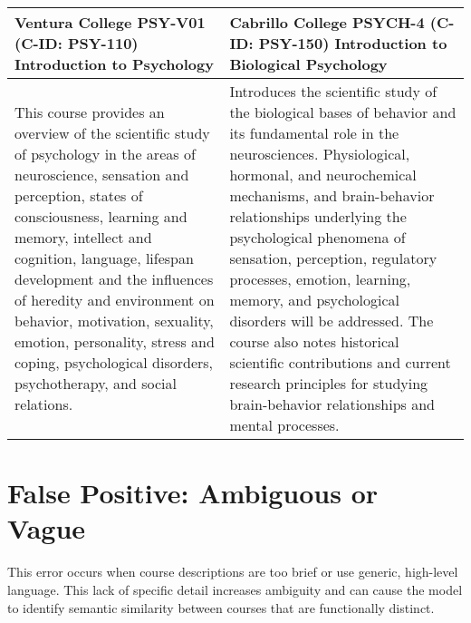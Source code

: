 \begin{longtable}{ >{\baselineskip=12pt}p{} >{\baselineskip=12pt}p{} }
Ventura College \newline PSY-V01 (C-ID: PSY-110) \newline Introduction to Psychology & Cabrillo College \newline PSYCH-4 (C-ID: PSY-150) \newline Introduction to Biological Psychology \\
\midrule
This course provides an overview of the scientific study of psychology in the areas of neuroscience, sensation and perception, states of consciousness, learning and memory, intellect and cognition, language, lifespan development and the influences of heredity and environment on behavior, motivation, sexuality, emotion, personality, stress and coping, psychological disorders, psychotherapy, and social relations. & Introduces the scientific study of the biological bases of behavior and its fundamental role in the neurosciences. Physiological, hormonal, and neurochemical mechanisms, and brain-behavior relationships underlying the psychological phenomena of sensation, perception, regulatory processes, emotion, learning, memory, and psychological disorders will be addressed. The course also notes historical scientific contributions and current research principles for studying brain-behavior relationships and mental processes. \\
\bottomrule\toprule
\end{longtable}

\section{False Positive: Ambiguous or Vague}\label{app:fpvague}
This error occurs when course descriptions are too brief or use generic, high-level language. This lack of specific detail increases ambiguity and can cause the model to identify semantic similarity between courses that are functionally distinct.

